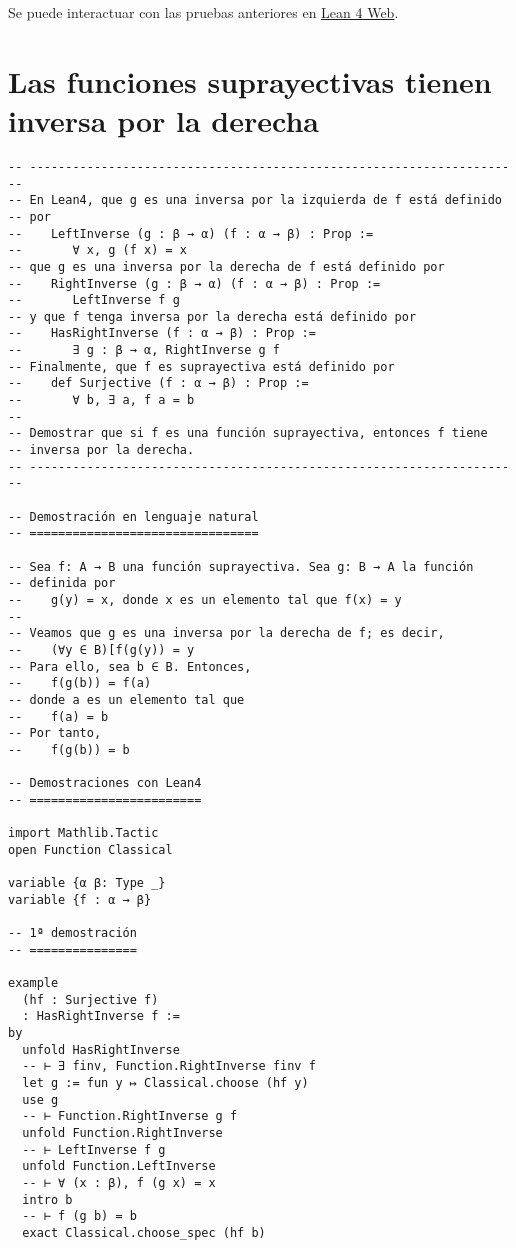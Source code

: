 Se puede interactuar con las pruebas anteriores en \href{https://lean.math.hhu.de/\#url=https://raw.githubusercontent.com/jaalonso/Calculemus2/main/src/Las\_funciones\_con\_inversa\_por\_la\_derecha\_son\_suprayectivas.lean}{Lean 4 Web}.

\section{Las funciones suprayectivas tienen inversa por la derecha}
\label{sec:org520ae25}
\begin{verbatim}
-- ---------------------------------------------------------------------
-- En Lean4, que g es una inversa por la izquierda de f está definido
-- por
--    LeftInverse (g : β → α) (f : α → β) : Prop :=
--       ∀ x, g (f x) = x
-- que g es una inversa por la derecha de f está definido por
--    RightInverse (g : β → α) (f : α → β) : Prop :=
--       LeftInverse f g
-- y que f tenga inversa por la derecha está definido por
--    HasRightInverse (f : α → β) : Prop :=
--       ∃ g : β → α, RightInverse g f
-- Finalmente, que f es suprayectiva está definido por
--    def Surjective (f : α → β) : Prop :=
--       ∀ b, ∃ a, f a = b
--
-- Demostrar que si f es una función suprayectiva, entonces f tiene
-- inversa por la derecha.
-- ---------------------------------------------------------------------

-- Demostración en lenguaje natural
-- ================================

-- Sea f: A → B una función suprayectiva. Sea g: B → A la función
-- definida por
--    g(y) = x, donde x es un elemento tal que f(x) = y
--
-- Veamos que g es una inversa por la derecha de f; es decir,
--    (∀y ∈ B)[f(g(y)) = y
-- Para ello, sea b ∈ B. Entonces,
--    f(g(b)) = f(a)
-- donde a es un elemento tal que
--    f(a) = b
-- Por tanto,
--    f(g(b)) = b

-- Demostraciones con Lean4
-- ========================

import Mathlib.Tactic
open Function Classical

variable {α β: Type _}
variable {f : α → β}

-- 1ª demostración
-- ===============

example
  (hf : Surjective f)
  : HasRightInverse f :=
by
  unfold HasRightInverse
  -- ⊢ ∃ finv, Function.RightInverse finv f
  let g := fun y ↦ Classical.choose (hf y)
  use g
  -- ⊢ Function.RightInverse g f
  unfold Function.RightInverse
  -- ⊢ LeftInverse f g
  unfold Function.LeftInverse
  -- ⊢ ∀ (x : β), f (g x) = x
  intro b
  -- ⊢ f (g b) = b
  exact Classical.choose_spec (hf b)


\end{verbatim}
